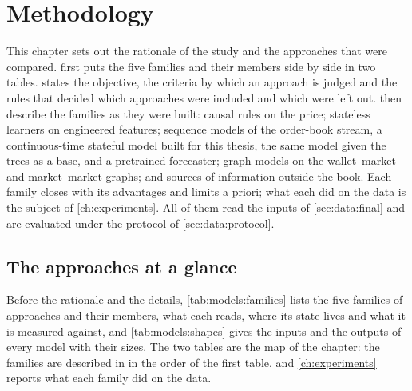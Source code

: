\chapter{Methodology}
\label{ch:models}

This chapter sets out the rationale of the study and the approaches that were compared.
 first puts the five families and their members side by side in
two tables.   states the objective, the criteria by which an
approach is judged and the rules that decided which approaches were included and which
were left out.   then describe the
families as they were built: causal rules on the price; stateless learners on engineered
features; sequence models of the order-book stream, a continuous-time stateful model
built for this thesis, the same model given the trees as a base, and a pretrained
forecaster; graph models on the wallet--market and market--market graphs; and sources of
information outside the book.  Each family closes with its advantages and limits a
priori; what each did on the data is the subject of \cref{ch:experiments}.  All of them read the inputs of
\cref{sec:data:final} and are evaluated under the protocol of \cref{sec:data:protocol}.

\section{The approaches at a glance}
\label{sec:models:summary}

Before the rationale and the details, \cref{tab:models:families} lists the five families
of approaches and their members, what each reads, where its state lives and what it is
measured against, and \cref{tab:models:shapes} gives the inputs and the outputs of every
model with their sizes.  The two tables are the map of the chapter: the families are
described in  in the order of the
first table, and \cref{ch:experiments} reports what each family did on the data.

